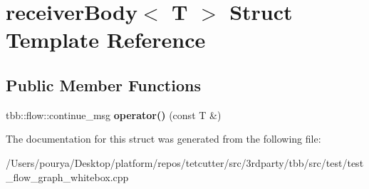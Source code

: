 \hypertarget{structreceiverBody}{}\section{receiver\+Body$<$ T $>$ Struct Template Reference}
\label{structreceiverBody}
\subsection*{Public Member Functions}
\begin{DoxyCompactItemize}
\item 
\hypertarget{structreceiverBody_a9a3ec186f8039af928a565cf16f4a499}{}tbb\+::flow\+::continue\+\_\+msg {\bfseries operator()} (const T \&)\label{structreceiverBody_a9a3ec186f8039af928a565cf16f4a499}

\end{DoxyCompactItemize}


The documentation for this struct was generated from the following file\+:\begin{DoxyCompactItemize}
\item 
/\+Users/pourya/\+Desktop/platform/repos/tetcutter/src/3rdparty/tbb/src/test/test\+\_\+flow\+\_\+graph\+\_\+whitebox.\+cpp\end{DoxyCompactItemize}
